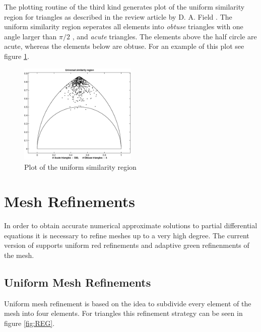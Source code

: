 The plotting routine of the third kind generates plot of the uniform similarity region for triangles as described in
the review article by D. A. Field \cite{FIE00}. The uniform similarity region seperates all elements into {\em obtuse}
triangles with one angle larger than $\pi/2$ , and {\em acute} triangles. The elements above the half circle are acute,
whereas the elements below are obtuse. For an example of this plot see figure \ref{fig:USR}.

\begin{figure}[htb]
  \centering
  \includegraphics[width=0.5\textwidth]{usr.eps}
  \caption{Plot of the uniform similarity region}
  \label{fig:USR}
\end{figure}


\section{Mesh Refinements}
\label{sect:MR}

In order to obtain accurate numerical approximate solutions to partial differential equations it is necessary to refine
meshes up to a very high degree. The current version of \LIBNAME supports uniform red refinements and adaptive green
refinenments of the mesh.


\subsection{Uniform Mesh Refinements}
\label{sect:UMR}

Uniform mesh refinement is based on the idea to subdivide every element of the mesh into four elements. For triangles
this refinement strategy can be seen in figure \ref{fig:REG}.

